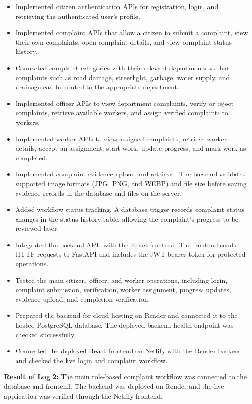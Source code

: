 \documentclass[12pt,a4paper]{article}
\begin{document}
\begin{itemize}
    \item Implemented citizen authentication APIs for registration, login, and retrieving the authenticated user's profile.
    \item Implemented complaint APIs that allow a citizen to submit a complaint, view their own complaints, open complaint details, and view complaint status history.
    \item Connected complaint categories with their relevant departments so that complaints such as road damage, streetlight, garbage, water supply, and drainage can be routed to the appropriate department.
    \item Implemented officer APIs to view department complaints, verify or reject complaints, retrieve available workers, and assign verified complaints to workers.
    \item Implemented worker APIs to view assigned complaints, retrieve worker details, accept an assignment, start work, update progress, and mark work as completed.
    \item Implemented complaint-evidence upload and retrieval. The backend validates supported image formats (JPG, PNG, and WEBP) and file size before saving evidence records in the database and files on the server.
    \item Added workflow status tracking. A database trigger records complaint status changes in the status-history table, allowing the complaint's progress to be reviewed later.
    \item Integrated the backend APIs with the React frontend. The frontend sends HTTP requests to FastAPI and includes the JWT bearer token for protected operations.
    \item Tested the main citizen, officer, and worker operations, including login, complaint submission, verification, worker assignment, progress updates, evidence upload, and completion verification.
    \item Prepared the backend for cloud hosting on Render and connected it to the hosted PostgreSQL database. The deployed backend health endpoint was checked successfully.
    \item Connected the deployed React frontend on Netlify with the Render backend and checked the live login and complaint workflow.
\end{itemize}

\textbf{Result of Log 2:} The main role-based complaint workflow was connected to the database and frontend. The backend was deployed on Render and the live application was verified through the Netlify frontend.
\end{document}
